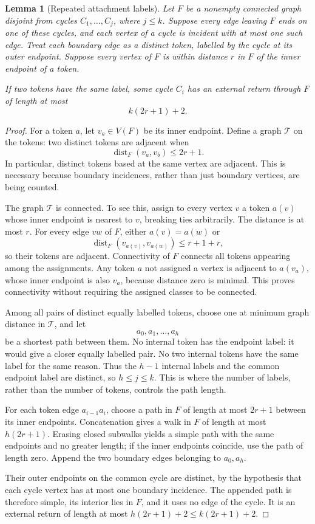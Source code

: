\documentclass[11pt,a4paper]{article}
\numberwithin{equation}{section}
\newtheorem{lemma}[theorem]{Lemma}
\theoremstyle{definition}
\theoremstyle{remark}
\newcommand{\dist}{\operatorname{dist}}
\begin{document}
\begin{lemma}[Repeated attachment labels]\label{lem:attachment-labels}
Let $F$ be a nonempty connected graph disjoint from cycles $C_1,\ldots,C_j$, where $j\le k$. Suppose every edge leaving $F$ ends on one of these cycles, and each vertex of a cycle is incident with at most one such edge. Treat each boundary edge as a distinct \emph{token}, labelled by the cycle at its outer endpoint. Suppose every vertex of $F$ is within distance $r$ in $F$ of the inner endpoint of a token.

If two tokens have the same label, some cycle $C_i$ has an external return through $F$ of length at most
\[
 k(2r+1)+2.
\]
\end{lemma}
\begin{proof}
For a token $a$, let $v_a\in V(F)$ be its inner endpoint. Define a graph $\mathcal T$ on the tokens: two distinct tokens are adjacent when
\[
 \dist_F(v_a,v_b)\le2r+1.
\]
In particular, distinct tokens based at the same vertex are adjacent. This is necessary because boundary incidences, rather than just boundary vertices, are being counted.

The graph $\mathcal T$ is connected. To see this, assign to every vertex $v$ a token $a(v)$ whose inner endpoint is nearest to $v$, breaking ties arbitrarily. The distance is at most $r$. For every edge $vw$ of $F$, either $a(v)=a(w)$ or
\[
 \dist_F(v_{a(v)},v_{a(w)})\le r+1+r,
\]
so their tokens are adjacent. Connectivity of $F$ connects all tokens appearing among the assignments. Any token $a$ not assigned a vertex is adjacent to $a(v_a)$, whose inner endpoint is also $v_a$, because distance zero is minimal. This proves connectivity without requiring the assigned classes to be connected.

Among all pairs of distinct equally labelled tokens, choose one at minimum graph distance in $\mathcal T$, and let
\[
 a_0,a_1,\ldots,a_h
\]
be a shortest path between them. No internal token has the endpoint label: it would give a closer equally labelled pair. No two internal tokens have the same label for the same reason. Thus the $h-1$ internal labels and the common endpoint label are distinct, so $h\le j\le k$. This is where the number of labels, rather than the number of tokens, controls the path length.

For each token edge $a_{i-1}a_i$, choose a path in $F$ of length at most $2r+1$ between its inner endpoints. Concatenation gives a walk in $F$ of length at most $h(2r+1)$. Erasing closed subwalks yields a simple path with the same endpoints and no greater length; if the inner endpoints coincide, use the path of length zero. Append the two boundary edges belonging to $a_0,a_h$.

Their outer endpoints on the common cycle are distinct, by the hypothesis that each cycle vertex has at most one boundary incidence. The appended path is therefore simple, its interior lies in $F$, and it uses no edge of the cycle. It is an external return of length at most $h(2r+1)+2\le k(2r+1)+2$.
\end{proof}
\end{document}
